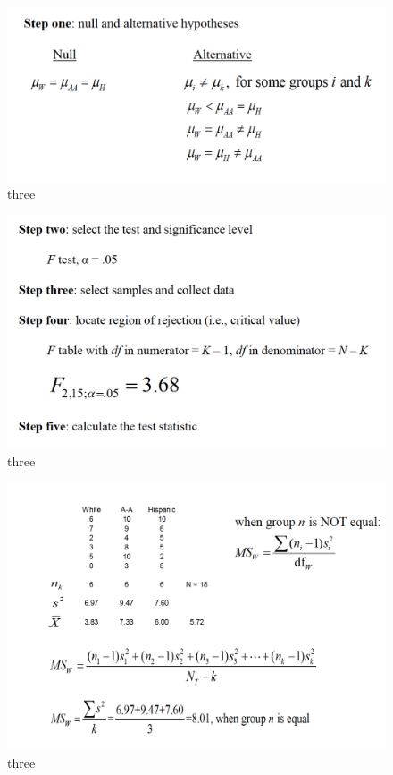 \documentclass[]{book}
\theoremstyle{definition}
\theoremstyle{definition}
\theoremstyle{definition}
\theoremstyle{remark}
\begin{document}
{\begin{figure}
\centering
\includegraphics{img/hicksanova6.png}
\caption{three}
\end{figure}

\begin{figure}
\centering
\includegraphics{img/hicksanova7.png}
\caption{three}
\end{figure}

\begin{figure}
\centering
\includegraphics{img/hicksanova8.png}
\caption{three}
\end{figure}

}
\end{document}
